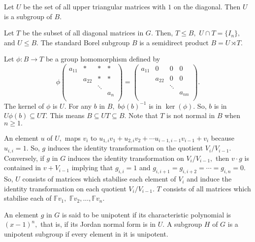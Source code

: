 \begin{definition}
	Let $U$ be the set of all upper triangular matrices with $1$ on
	the diagonal. Then $U$ is a subgroup of $B.$
\end{definition}

\begin{proposition}
Let $T$ be the subset of all diagonal matrices in $G.$
Then, $T \leq B,$ $U \cap T = \{I_n\},$ and $U \leq B.$
	The standard Borel subgroup $B$ is a semidirect product
	$ B = U \rtimes T.$
\end{proposition}

Let $\phi \colon B \to T$ be a group homomorphism defined by
$$ \phi \begin{pmatrix}
	a_{11} & \ast  & \ast & \ast \\
	 & a_{22} & \ast  & \ast \\
	  & & \ddots & \\
	   & && a_{n} \\
\end{pmatrix}
= \begin{pmatrix}
	a_{11} & 0 & 0 & 0 \\
	       & a_{22} & 0 & 0 \\
	       && \ddots &\\
	       &&& a_{nn}\\
\end{pmatrix}
.$$
The kernel of $ \phi$ is $U.$
For any $b$ in $B,$ $b \phi(b)^{-1}$ is in $\ker(\phi).$
So, $b$ is in $U \phi(b) \subseteq UT.$
This means $B \subseteq UT \subseteq B.$
Note that $T$ is not normal in $B$ when $n \geq 1.$

An element $u$ of $U,$ maps $v_i$ to $u_{1,i} v_1 + u_{2,i} v_2 + \cdots
u_{i-1,i-1} v_{i-1} + v_i$ because $u_{i,i} = 1.$ So, $g$ induces the identity transformation
on the quotient $V_i /V_{i-1}.$
Conversely, if $g$ in $G$ induces the identity transformation on $V_i/
V_{i-1},$ then $v \cdot g$ is contained in $v + V_{i-1}$ implying
that $g_{i,i} = 1$ and $g_{i,i+1} = g_{i,i+2} = \cdots = g_{i,n} = 0.$
So, $U$ consists of matrices which stabilise each element of $V_i$
and induce the identity transformation on each quotient $V_i /V_{i-1}.$
$T$ consists of all matrices which stabilise each of $ \mathbb{F} v_1,$
$\mathbb{F} v_2 , \dotsc, \mathbb{F} v_n.$

\begin{definition}
	An element $g$ in $G$ is said to be unipotent if its 
	characteristic polynomial is $(x-1)^n,$ that is, if its Jordan
	normal form is in $U.$
	A subgroup $H$ of $G$ is a unipotent subgroup if every element
	in it is unipotent.
\end{definition}


